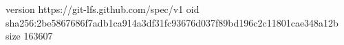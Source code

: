 version https://git-lfs.github.com/spec/v1
oid sha256:2be5867686f7adb1ca914a3df31fc93676d037f89bd196c2c11801cae348a12b
size 163607
